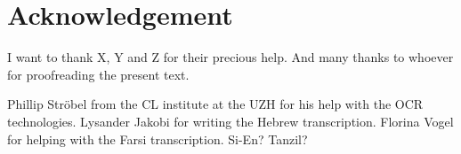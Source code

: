 {}
\chapter*{Acknowledgement}

I want to thank X, Y and Z for their precious help.
And many thanks to whoever for proofreading the present text.

Phillip Ströbel from the CL institute at the UZH for his help with the OCR technologies. 
Lysander Jakobi for writing the Hebrew transcription. 
Florina Vogel for helping with the Farsi transcription. Si-En? Tanzil?

\newpage